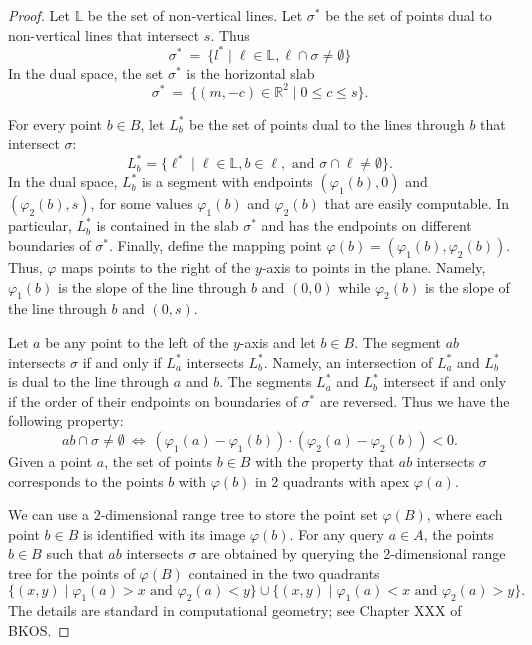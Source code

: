 \documentclass[a4paper,USenglish,numberwithinsect]{lipics}
\newcommand{\RR}{\ensuremath{\mathbb R}}  %
\newcommand{\LL}{\ensuremath{\mathbb L}}  %
\let\le\leqslant
\begin{document}
\begin{appendix}
\begin{proof}
	Let $\LL$ be the set of non-vertical lines.
	Let $\sigma^*$ be the set of points dual to non-vertical lines that intersect $s$.
	Thus
	\[
		\sigma^* ~=~ \{ l^* \mid \ell\in \LL, \ell\cap \sigma\neq \emptyset\} 
	\]
	In the dual space, the set $\sigma^*$ is the horizontal slab 
	\[
		\sigma^* ~=~ \{ (m,-c)\in \RR^2\mid 0\le c\le s\}.
	\]
	
	For every point $b\in B$, let $L^* _b$ be the set of points dual
	to the lines through $b$ that intersect $\sigma$:
	\[
		L^*_b=\{ \ell^* \mid \ell\in \LL, b \in \ell, \text{ and } \sigma\cap \ell\not= \emptyset\}.
	\]
	In the dual space, $L^*_b$ is a segment with endpoints 
	$(\varphi_1(b),0)$ and $(\varphi_2(b),s)$, for some values $\varphi_1(b)$ and $\varphi_2(b)$
	that are easily computable.
	In particular, $L^*_b$ is contained in the slab $\sigma^*$ and has the endpoints on
	different boundaries of $\sigma^*$.
	Finally, define the mapping point $\varphi(b)=(\varphi_1(b),\varphi_2(b))$.
	Thus, $\varphi$ maps points to the right of the $y$-axis to points
	in the plane. Namely, $\varphi_1(b)$ is the slope of the line through $b$
	and $(0,0)$ while $\varphi_2(b)$ is the slope of the line through $b$ and $(0,s)$.

	Let $a$ be any point to the left of the $y$-axis and let $b\in B$.
	The segment $ab$ intersects $\sigma$ if and only if $L^*_a$ intersects $L^*_b$.
	Namely, an intersection of $L^*_a$ and $L^*_b$ is dual to the line
	through $a$ and $b$. The segments $L^*_a$ and $L^*_b$ intersect if
	and only if the order of their endpoints on boundaries of $\sigma^*$ are reversed.
	Thus we have the following property:
	\[
		ab \cap \sigma \neq \emptyset ~\Longleftrightarrow ~ 
		(\varphi_1(a)-\varphi_1(b)) \cdot (\varphi_2(a)- \varphi_2(b)) < 0.
	\]			
	Given a point $a$, the set of points $b\in B$ with the property
	that $ab$ intersects $\sigma$ corresponds to the points $b$ with $\varphi(b)$
	in 2 quadrants with apex $\varphi(a)$. 

	We can use a $2$-dimensional range tree to store the point set $\varphi(B)$,
	where each point $b\in B$ is identified with its image $\varphi(b)$. 
	For any query $a\in A$, the points $b\in B$ such that $ab$ intersects
	$\sigma$ are obtained by querying the 2-dimensional range tree for the points
	of $\varphi(B)$ contained in the two quadrants 
	\[
		\{(x,y)\mid  \varphi_1(a) > x \text{ and } \varphi_2(a) < y\} \cup
		\{(x,y)\mid  \varphi_1(a) < x \text{ and } \varphi_2(a) > y\}.
	\]
	The details are standard in computational geometry; see Chapter XXX of BKOS.
\end{proof}




\end{appendix}
\end{document}
